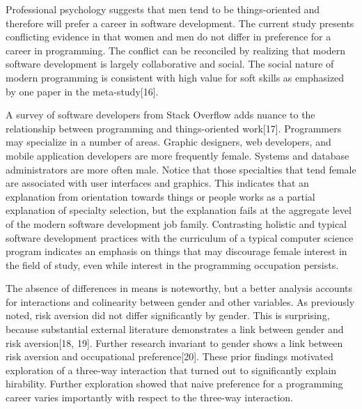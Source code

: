 \documentclass[review]{elsarticle}
\begin{document}
Professional psychology suggests that men tend to be things-oriented and therefore will prefer a career in software development.
The current study presents conflicting evidence in that women and men do not differ in preference for a career in programming.
The conflict can be reconciled by realizing that modern software development is largely collaborative and social.
The social nature of modern programming is consistent with high value for soft skills as emphasized by one paper in the meta-study[16].

A survey of software developers from Stack Overflow adds nuance to the relationship between programming and things-oriented work[17].
Programmers may specialize in a number of areas.
Graphic designers, web developers, and mobile application developers are more frequently female.
Systems and database administrators are more often male.
Notice that those specialties that tend female are associated with user interfaces and graphics.
This indicates that an explanation from orientation towards things or people works as a partial explanation of specialty selection,
but the explanation fails at the aggregate level of the modern software development job family.
Contrasting holistic and typical software development practices with the curriculum of a typical computer science program
indicates an emphasis on things that may discourage female interest in the field of study,
even while interest in the programming occupation persists.

The absence of differences in means is noteworthy,
but a better analysis accounts for interactions and colinearity between gender and other variables.
As previously noted, risk aversion did not differ significantly by gender.
This is surprising, because substantial external literature demonstrates a link between gender and risk aversion[18, 19].
Further research invariant to gender shows a link between risk aversion and occupational preference[20].
These prior findings motivated exploration of a three-way interaction that turned out to significantly explain hirability.
Further exploration showed that naive preference for a programming career varies importantly with respect to the three-way interaction.
\end{document}
